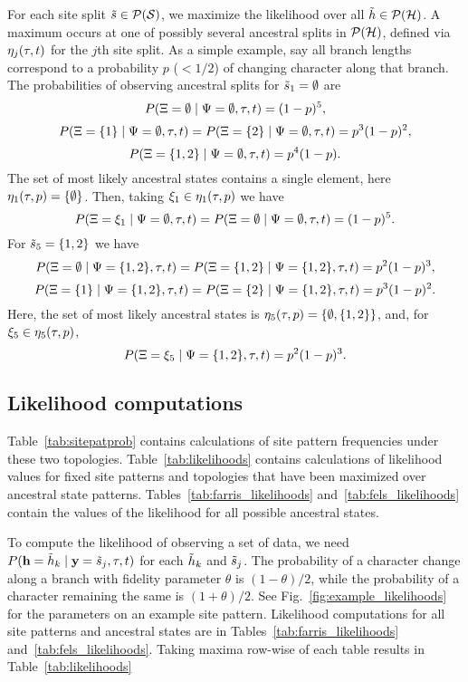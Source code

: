 For each site split $\tilde{s}\in\mathcal{P}(\mathcal{S})$, we maximize the likelihood over all $\tilde{h}\in\mathcal{P}(\mathcal{H})$.
A maximum occurs at one of possibly several ancestral splits in $\mathcal{P}(\mathcal{H})$, defined via $\eta_j(\tau, t)$ for the $j$th site split.
As a simple example, say all branch lengths correspond to a probability $p$ ($< 1/2$) of changing character along that branch.
The probabilities of observing ancestral splits for $\tilde{s}_1=\emptyset$ are
$$
P(\Xi=\emptyset \mid \Psi=\emptyset, \tau, t) =
(1-p)^5,
$$
$$
P(\Xi=\{1\} \mid \Psi=\emptyset, \tau, t) =
P(\Xi=\{2\} \mid \Psi=\emptyset, \tau, t) =
p^3(1-p)^2,
$$
$$
P(\Xi=\{1,2\} \mid \Psi=\emptyset, \tau, t) =
p^4(1-p).
$$
The set of most likely ancestral states contains a single element, here $\eta_1(\tau, p)=\{\emptyset\}$.
Then, taking $\xi_1\in\eta_1(\tau, p)$ we have
$$
P(\Xi=\xi_1 \mid \Psi=\emptyset, \tau, t) =
P(\Xi=\emptyset \mid \Psi=\emptyset, \tau, t) =
(1-p)^5.
$$
For $\tilde{s}_5=\{1,2\}$ we have
$$
P(\Xi=\emptyset \mid \Psi=\{1,2\}, \tau, t) =
P(\Xi=\{1,2\} \mid \Psi=\{1,2\}, \tau, t) =
p^2(1-p)^3,
$$
$$
P(\Xi=\{1\} \mid \Psi=\{1,2\}, \tau, t) =
P(\Xi=\{2\} \mid \Psi=\{1,2\}, \tau, t) =
p^3(1-p)^2.
$$
Here, the set of most likely ancestral states is $\eta_5(\tau, p)=\{\emptyset,\{1,2\}\}$, and, for $\xi_5\in\eta_5(\tau, p)$,
$$
P(\Xi=\xi_5 \mid \Psi=\{1,2\}, \tau, t) =
p^2(1-p)^3.
$$

\subsection*{Likelihood computations}

Table~\ref{tab:sitepatprob} contains calculations of site pattern frequencies under these two topologies.
Table~\ref{tab:likelihoods} contains calculations of likelihood values for fixed site patterns and topologies that have been maximized over ancestral state patterns.
Tables~\ref{tab:farris_likelihoods} and~\ref{tab:fels_likelihoods} contain the values of the likelihood for all possible ancestral states.

To compute the likelihood of observing a set of data, we need $P(\mathbf{h}=\tilde{h}_k\mid \mathbf{y}=\tilde{s}_j,\tau,t)$ for each $\tilde{h}_k$ and $\tilde{s}_j$.
The probability of a character change along a branch with fidelity parameter $\theta$ is $(1-\theta)/2$, while the probability of a character remaining the same is $(1+\theta)/2$.
See Fig.~\ref{fig:example_likelihoods} for the parameters on an example site pattern.
Likelihood computations for all site patterns and ancestral states are in Tables~\ref{tab:farris_likelihoods} and~\ref{tab:fels_likelihoods}.
Taking maxima row-wise of each table results in Table~\ref{tab:likelihoods}

